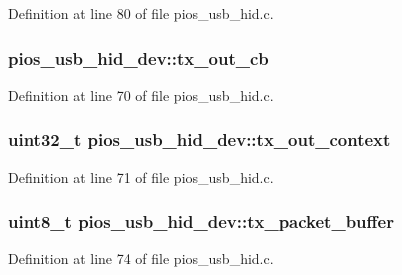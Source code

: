 \-Definition at line 80 of file pios\-\_\-usb\-\_\-hid.\-c.

\hypertarget{group___p_i_o_s___u_s_b___h_i_d_ga04c76a0e0e88338371d2f12cd9749309}{
\subsubsection[{tx\-\_\-out\-\_\-cb}]{ {\bf pios\-\_\-usb\-\_\-hid\-\_\-dev\-::tx\-\_\-out\-\_\-cb}}}\label{group___p_i_o_s___u_s_b___h_i_d_ga04c76a0e0e88338371d2f12cd9749309}


\-Definition at line 70 of file pios\-\_\-usb\-\_\-hid.\-c.

\hypertarget{group___p_i_o_s___u_s_b___h_i_d_ga1a95563a3fb1aee312d7793c77f81bf2}{
\subsubsection[{tx\-\_\-out\-\_\-context}]{\setlength{\rightskip}{0pt plus 5cm}uint32\-\_\-t {\bf pios\-\_\-usb\-\_\-hid\-\_\-dev\-::tx\-\_\-out\-\_\-context}}}\label{group___p_i_o_s___u_s_b___h_i_d_ga1a95563a3fb1aee312d7793c77f81bf2}


\-Definition at line 71 of file pios\-\_\-usb\-\_\-hid.\-c.

\hypertarget{group___p_i_o_s___u_s_b___h_i_d_gad6c7b8ecc0fe215e9d18d6d3281977c6}{
\subsubsection[{tx\-\_\-packet\-\_\-buffer}]{\setlength{\rightskip}{0pt plus 5cm}uint8\-\_\-t {\bf pios\-\_\-usb\-\_\-hid\-\_\-dev\-::tx\-\_\-packet\-\_\-buffer}}}\label{group___p_i_o_s___u_s_b___h_i_d_gad6c7b8ecc0fe215e9d18d6d3281977c6}


\-Definition at line 74 of file pios\-\_\-usb\-\_\-hid.\-c.

